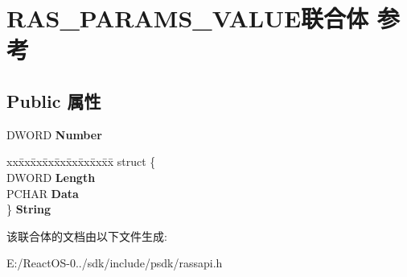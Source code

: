 \hypertarget{union_r_a_s___p_a_r_a_m_s___v_a_l_u_e}{}\section{R\+A\+S\+\_\+\+P\+A\+R\+A\+M\+S\+\_\+\+V\+A\+L\+U\+E联合体 参考}
\label{union_r_a_s___p_a_r_a_m_s___v_a_l_u_e}
\subsection*{Public 属性}
\begin{DoxyCompactItemize}
\item 
\mbox{\label{union_r_a_s___p_a_r_a_m_s___v_a_l_u_e_a7a0d86b4b4cb71dee377f52834acdac3}} 
D\+W\+O\+RD {\bfseries Number}
\item 
\mbox{\label{union_r_a_s___p_a_r_a_m_s___v_a_l_u_e_a632c6a47ad013d66d77dd4ff74b17496}} 
\begin{tabbing}
xx\=xx\=xx\=xx\=xx\=xx\=xx\=xx\=xx\=\kill
struct \{\\
\>DWORD {\bfseries Length}\\
\>PCHAR {\bfseries Data}\\
\} {\bfseries String}\\

\end{tabbing}\end{DoxyCompactItemize}


该联合体的文档由以下文件生成\+:\begin{DoxyCompactItemize}
\item 
E\+:/\+React\+O\+S-\/0../sdk/include/psdk/rassapi.\+h\end{DoxyCompactItemize}
